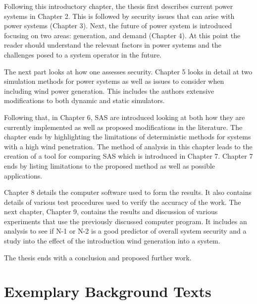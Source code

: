 \documentclass[a4paper,oneside,12pt]{report}
\begin{document}
Following this introductory chapter, the thesis first describes current power systems in Chapter 2. This is followed by security issues that can arise with power systems (Chapter 3). Next, the future of power system is introduced focusing on two areas: generation, and demand (Chapter 4). At this point the reader should understand the relevant factors in power systems and the challenges posed to a system operator in the future.

The next part looks at how one assesses security. Chapter 5 looks in detail at two simulation methods for power systems as well as issues to consider when including wind power generation. This includes the authors extensive modifications to both dynamic and static simulators.

Following that, in Chapter 6, SAS are introduced looking at both how they are currently implemented as well as proposed modifications in the literature. The chapter ends by highlighting the limitations of deterministic methods for systems with a high wind penetration. The method of analysis in this chapter leads to the creation of a tool for comparing SAS which is introduced in Chapter 7. Chapter 7 ends by listing limitations to the proposed method as well as possible applications. 

Chapter 8 details the computer software used to form the results. It also contains details of various test procedures used to verify the accuracy of the work.  The next chapter, Chapter 9, contains the results and discussion of various experiments that use the previously discussed computer program. It includes an analysis to see if N-1 or N-2 is a good predictor of overall system security and a study into the effect of the introduction wind generation into a system.

The thesis ends with a conclusion and proposed further work.

\pagebreak
\section{Exemplary Background Texts}
\end{document}
